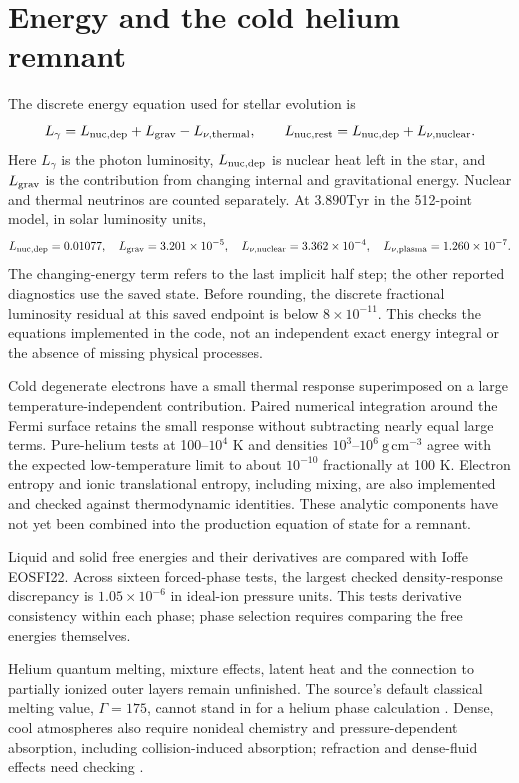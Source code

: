 \documentclass[11pt,letterpaper]{article}
\newcommand{\Tyr}{\mathrm{Tyr}}
\begin{document}
\section{Energy and the cold helium remnant}
The discrete energy equation used for stellar evolution is
\[
 L_\gamma=L_{\rm nuc,dep}+L_{\rm grav}-L_{\nu,\rm thermal},\qquad
 L_{\rm nuc,rest}=L_{\rm nuc,dep}+L_{\nu,\rm nuclear}.
\]
Here $L_\gamma$ is the photon luminosity, $L_{\rm nuc,dep}$ is nuclear heat
left in the star, and $L_{\rm grav}$ is the contribution from changing internal
and gravitational energy. Nuclear and thermal neutrinos are counted separately.
At $3.890\Tyr$ in the 512-point model, in solar luminosity units,
\[
 L_{\rm nuc,dep}=0.01077,\quad
 L_{\rm grav}=3.201\times10^{-5},\quad
 L_{\nu,\rm nuclear}=3.362\times10^{-4},\quad
 L_{\nu,\rm plasma}=1.260\times10^{-7}.
\]
The changing-energy term refers to the last implicit half step; the other
reported diagnostics use the saved state. Before rounding, the discrete
fractional luminosity residual at this saved endpoint is below $8\times10^{-11}$. This checks the equations implemented
in the code, not an independent exact energy integral or the absence of
missing physical processes.

Cold degenerate electrons have a small thermal response superimposed on a
large temperature-independent contribution. Paired numerical integration
around the Fermi surface retains the small response without subtracting
nearly equal large terms. Pure-helium tests at 100--$10^4$ K and densities
$10^3$--$10^6\ \mathrm{g\,cm^{-3}}$ agree with the expected low-temperature
limit to about $10^{-10}$ fractionally at 100 K. Electron entropy and ionic
translational entropy, including mixing, are also implemented and checked
against thermodynamic identities. These analytic components have not yet been
combined into the production equation of state for a remnant.

Liquid and solid free energies and their derivatives are compared with
Ioffe EOSFI22. Across sixteen forced-phase tests, the largest checked
density-response discrepancy is $1.05\times10^{-6}$ in ideal-ion pressure
units. This tests derivative consistency within each phase; phase selection
requires comparing the free energies themselves.

Helium quantum melting, mixture effects, latent heat and the connection to
partially ionized outer layers remain unfinished. The source's default
classical melting value, $\Gamma=175$, cannot stand in for a helium phase
calculation \cite{baiko22}. Dense, cool atmospheres also require nonideal
chemistry and pressure-dependent absorption, including collision-induced
absorption; refraction and dense-fluid effects need checking \cite{blouin18}.
\end{document}

